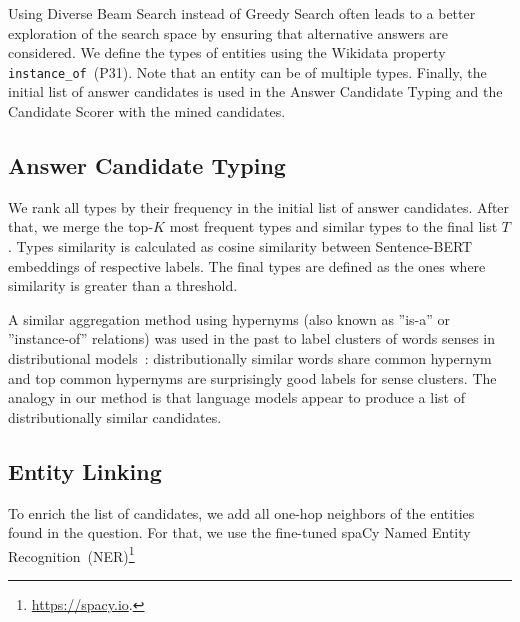 Using Diverse Beam Search instead of Greedy Search often leads to a better exploration of the search space by ensuring that alternative answers are considered.  We define the types of entities using the Wikidata property \texttt{instance\_of}~(P31). Note that an entity can be of multiple types. Finally, the initial list of answer candidates is used in the Answer Candidate Typing and the Candidate Scorer with the mined candidates. 

\subsection{Answer Candidate Typing} \label{act}
We rank all types by their frequency in the initial list of answer candidates. 
After that, we merge the top-$K$ most frequent types and similar types to the final list $T$.
Types similarity is calculated as cosine similarity between Sentence-BERT~\cite{reimers-2019-sentence-bert} embeddings of respective labels. The final types are defined as the ones where similarity is greater than a threshold.

A similar aggregation method using hypernyms (also known as ''is-a''  or ''instance-of'' relations) was used in the past to label clusters of words senses in distributional models~\cite{biemann2013text}: distributionally similar words share common hypernym and top common hypernyms are surprisingly good labels for sense clusters. The analogy in our method is that language models appear to produce a list of distributionally similar candidates.

\subsection{Entity Linking}
To enrich the list of candidates, we add all one-hop neighbors of the entities found in the question. For that, we use the fine-tuned spaCy Named Entity Recognition~(NER)\footnote{\url{https://spacy.io}.}

